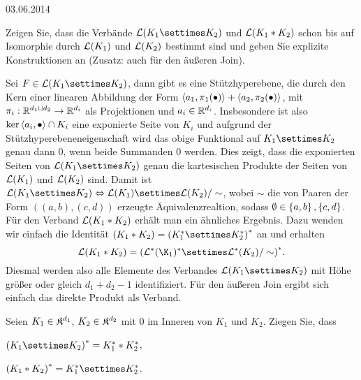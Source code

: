 \documentclass{article}
\begin{document}
\hfill{03.06.2014}

\begin{exercise}
    Zeigen Sie, dass die Verbände $\cL(K_1\settimes K_2)$ und $\mathcal{L}(K_1\ast K_2)$ schon bis auf Isomorphie durch $\mathcal{L}(K_1)$ und $\mathcal{L}(K_2)$ bestimmt sind und geben Sie explizite Konstruktionen an (Zusatz: auch für den äußeren Join).
\end{exercise}

\begin{solution}
    Sei $F\in\cL(K_1\settimes K_2)$, dann gibt es eine Stützhyperebene, die durch den Kern einer linearen Abbildung der Form $\left\langle a_1,\pi_1(\bullet) \right\rangle+\left\langle a_2,\pi_2(\bullet) \right\rangle$, mit $\pi_i:\mathbb{R}^{d_1\mathbin{\sqcup} d_2}\rightarrow \mathbb{R}^{d_i}$ als Projektionen und $a_i\in\mathbb{R}^{d_i}$.
    Insbesondere ist also $\ker{\left\langle a_i,\bullet \right\rangle}\cap K_i$ eine exponierte Seite von $K_i$ und aufgrund der Stützhyperebeneneigenschaft wird das obige Funktional auf $K_1\settimes K_2$ genau dann $0$, wenn beide Summanden $0$ werden.
        Dies zeigt, dass die exponierten Seiten von $\cL(K_1\settimes K_2)$ genau die kartesischen Produkte der Seiten von $\mathcal{L}(K_1)$ und $\mathcal{L}(K_2)$ sind.
        Damit ist $\cL(K_1\settimes K_2)\iso \cL(K_1)\settimes \cL(K_2)/\sim$, wobei $\sim$ die von Paaren der Form $((a,b),(c,d))$ erzeugte Äquivalenzrealtion, sodass $\emptyset\in\set{a,b},\set{c,d}$.
        Für den Verband $\mathcal{L}(K_1\ast K_2)$ erhält man ein ähnliches Ergebnis. Dazu wenden wir einfach die Identität $(K_1\ast K_2)={(K_1^{\ast}\settimes K_2^{\ast})}^{\ast}$ an und erhalten
            $$
            \cL(K_1\ast K_2)={(\cL^{\ast}(\K_1)^{\ast}\settimes \cL^{\ast}(K_2)/\sim)}^{\ast}.
            $$
            Diesmal werden also alle Elemente des Verbandes $\cL(K_1\settimes K_2)$ mit Höhe größer oder gleich $d_1+d_2-1$ identifiziert.
            Für den äußeren Join ergibt sich einfach das direkte Produkt als Verband.
\end{solution}

\begin{exercise}
    Seien $K_1\in\mathfrak{K}^{d_1}$, $K_2\in\mathfrak{K}^{d_2}$ mit $0$ im Inneren von $K_1$ und $K_2$.
    Ziegen Sie, dass
    \begin{tasks}
            \item ${(K_1\settimes K_2)}^{\ast}=K_1^{\ast}\ast K_2^{\ast}$,
            \item ${(K_1\ast K_2)}^{\ast}=K_1^{\ast}\settimes K_2^{\ast}$.
    \end{tasks}
\end{exercise}
\end{document}
